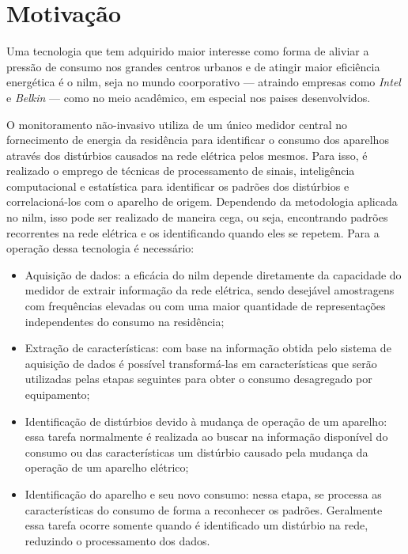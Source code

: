 \section{Motivação}

Uma tecnologia que tem adquirido maior interesse como forma de aliviar
a pressão de consumo nos grandes centros urbanos e de atingir maior
eficiência energética é o \acf{nilm}, seja no mundo coorporativo --- atraindo
empresas como \emph{Intel} e \emph{Belkin} --- como no meio acadêmico,
em especial nos paises desenvolvidos. 

O monitoramento não-invasivo utiliza de um único medidor central no
fornecimento de energia da residência para identificar o consumo dos
aparelhos através dos distúrbios causados na rede elétrica pelos
mesmos. Para isso, é realizado o emprego de técnicas de processamento
de sinais, inteligência computacional e estatística para identificar
os padrões dos distúrbios e correlacioná-los com o aparelho de origem.
Dependendo da metodologia aplicada no \acs{nilm}, isso pode ser
realizado de maneira cega, ou seja, encontrando padrões recorrentes
na rede elétrica e os identificando quando eles se repetem. Para a
operação dessa tecnologia é necessário:

\begin{itemize}
\item Aquisição de dados: a eficácia do \acs{nilm} depende diretamente
da capacidade do medidor de extrair informação da rede elétrica, sendo
desejável amostragens com frequências elevadas ou com uma maior
quantidade de representações independentes do consumo na residência;
\item Extração de características: com base na informação obtida pelo
sistema de aquisição de dados é possível transformá-las em
características que serão utilizadas pelas etapas seguintes para obter
o consumo desagregado por equipamento;
\item Identificação de distúrbios devido à mudança de operação de um
aparelho: essa tarefa normalmente é realizada ao buscar na informação
disponível do consumo ou das características um distúrbio causado pela
mudança da operação de um aparelho elétrico;
\item Identificação do aparelho e seu novo consumo: nessa etapa, se
processa as características do consumo de forma a reconhecer os
padrões. Geralmente essa tarefa ocorre somente quando é identificado
um distúrbio na rede, reduzindo o processamento dos dados.
\end{itemize}

